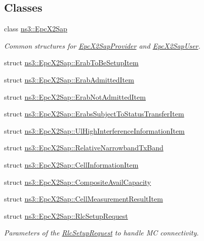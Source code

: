 \subsection*{Classes}
\begin{DoxyCompactItemize}
\item 
class \hyperlink{classns3_1_1EpcX2Sap}{ns3\+::\+Epc\+X2\+Sap}
\begin{DoxyCompactList}\small\item\em Common structures for \hyperlink{classns3_1_1EpcX2SapProvider}{Epc\+X2\+Sap\+Provider} and \hyperlink{classns3_1_1EpcX2SapUser}{Epc\+X2\+Sap\+User}. \end{DoxyCompactList}\item 
struct \hyperlink{structns3_1_1EpcX2Sap_1_1ErabToBeSetupItem}{ns3\+::\+Epc\+X2\+Sap\+::\+Erab\+To\+Be\+Setup\+Item}
\item 
struct \hyperlink{structns3_1_1EpcX2Sap_1_1ErabAdmittedItem}{ns3\+::\+Epc\+X2\+Sap\+::\+Erab\+Admitted\+Item}
\item 
struct \hyperlink{structns3_1_1EpcX2Sap_1_1ErabNotAdmittedItem}{ns3\+::\+Epc\+X2\+Sap\+::\+Erab\+Not\+Admitted\+Item}
\item 
struct \hyperlink{structns3_1_1EpcX2Sap_1_1ErabsSubjectToStatusTransferItem}{ns3\+::\+Epc\+X2\+Sap\+::\+Erabs\+Subject\+To\+Status\+Transfer\+Item}
\item 
struct \hyperlink{structns3_1_1EpcX2Sap_1_1UlHighInterferenceInformationItem}{ns3\+::\+Epc\+X2\+Sap\+::\+Ul\+High\+Interference\+Information\+Item}
\item 
struct \hyperlink{structns3_1_1EpcX2Sap_1_1RelativeNarrowbandTxBand}{ns3\+::\+Epc\+X2\+Sap\+::\+Relative\+Narrowband\+Tx\+Band}
\item 
struct \hyperlink{structns3_1_1EpcX2Sap_1_1CellInformationItem}{ns3\+::\+Epc\+X2\+Sap\+::\+Cell\+Information\+Item}
\item 
struct \hyperlink{structns3_1_1EpcX2Sap_1_1CompositeAvailCapacity}{ns3\+::\+Epc\+X2\+Sap\+::\+Composite\+Avail\+Capacity}
\item 
struct \hyperlink{structns3_1_1EpcX2Sap_1_1CellMeasurementResultItem}{ns3\+::\+Epc\+X2\+Sap\+::\+Cell\+Measurement\+Result\+Item}
\item 
struct \hyperlink{structns3_1_1EpcX2Sap_1_1RlcSetupRequest}{ns3\+::\+Epc\+X2\+Sap\+::\+Rlc\+Setup\+Request}
\begin{DoxyCompactList}\small\item\em Parameters of the \hyperlink{structns3_1_1EpcX2Sap_1_1RlcSetupRequest}{Rlc\+Setup\+Request} to handle MC connectivity. \end{DoxyCompactList}\item 

\end{DoxyCompactItemize}
